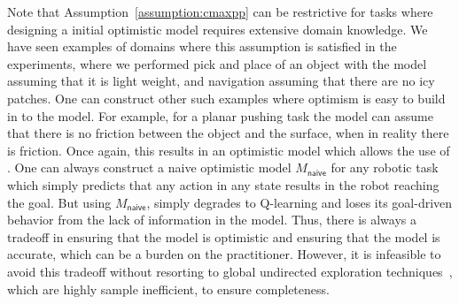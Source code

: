 Note that Assumption~\ref{assumption:cmaxpp} can
be restrictive for tasks where designing a initial optimistic
model requires extensive domain
knowledge. We have seen examples of domains where this
assumption is satisfied in the experiments, where we performed pick and place of
an object with the model assuming that it is light weight, and navigation
assuming that there are no icy patches. One can construct other such examples
where optimism is easy to build in to the model. For example, for a planar
pushing task the model can assume that there is no friction between the object
and the surface, when in reality there is friction. Once again, this results in
an optimistic model which allows the use of \cmaxpp{}. One can always construct
a naive optimistic model $M_{\mathsf{naive}}$ for any robotic task which simply
predicts that any action in any state results in the robot reaching the goal.
But using $M_{\mathsf{naive}}$, \cmaxpp{} simply degrades to Q-learning and
loses its goal-driven behavior from the lack of information in the model. Thus,
there is always a tradeoff in ensuring that the model is optimistic and ensuring
that the model is accurate, which can be a burden on the practitioner. However,
it is infeasible to avoid this tradeoff
without resorting to global undirected exploration
techniques~\cite{Thrun-1992-15850}, which are highly sample
inefficient, to ensure completeness.


